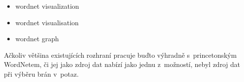 \documentclass[a4paper, 11pt, oneside, showtrims]{book}
\begin{document}
					\begin{itemize}
						\item wordnet visualization
						\item wordnet visualisation
						\item wordnet graph
					\end{itemize}

					 Ačkoliv většina existujících rozhraní pracuje buďto výhradně s~princetonským WordNetem, či jej jako zdroj dat nabízí jako jednu z~možností, nebyl zdroj dat při výběru brán v~potaz.

\end{document}
